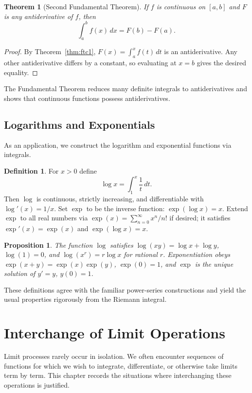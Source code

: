 \documentclass{article}
\theoremstyle{definition}
\newtheorem{definition}{Definition}[section]
\theoremstyle{plain}
\newtheorem{theorem}{Theorem}[section]
\newtheorem{proposition}{Proposition}[section]
\begin{document}
\begin{theorem}[Second Fundamental Theorem]\label{thm:ftc2}
	If $f$ is continuous on $[a,b]$ and $F$ is any antiderivative of $f$, then
	\[
		\int_a^b f(x)\,dx = F(b) - F(a).
	\]
\end{theorem}
\begin{proof}
	By Theorem~\ref{thm:ftc1}, $F(x) = \int_a^x f(t)\,dt$ is an antiderivative. Any other antiderivative differs by a constant, so evaluating at $x=b$ gives the desired equality.
\end{proof}

The Fundamental Theorem reduces many definite integrals to antiderivatives and shows that continuous functions possess antiderivatives.

\subsection{Logarithms and Exponentials}\label{subsec:log-exp}
As an application, we construct the logarithm and exponential functions via integrals.
\begin{definition}\label{def:log}
	For $x>0$ define
	\[
		\log x = \int_1^x \frac{1}{t}\,dt.
	\]
	Then $\log$ is continuous, strictly increasing, and differentiable with $\log'(x)=1/x$. Set $\exp$ to be the inverse function: $\exp(\log x)=x$.
	Extend $\exp$ to all real numbers via $\exp(x) = \sum_{n=0}^\infty x^n/n!$ if desired; it satisfies $\exp'(x)=\exp(x)$ and $\exp(\log x)=x$.
\end{definition}

\begin{proposition}
	The function $\log$ satisfies $\log(xy)=\log x + \log y$, $\log(1)=0$, and $\log(x^r)=r\log x$ for rational $r$. Exponentiation obeys $\exp(x+y)=\exp(x)\exp(y)$, $\exp(0)=1$, and $\exp$ is the unique solution of $y' = y$, $y(0)=1$.
\end{proposition}

These definitions agree with the familiar power-series constructions and yield the usual properties rigorously from the Riemann integral.

\section{Interchange of Limit Operations}\label{sec:limit-operations}
	Limit processes rarely occur in isolation. We often encounter sequences of functions for which we wish to integrate, differentiate, or otherwise take limits term by term. This chapter records the situations where interchanging these operations is justified.
\end{document}
